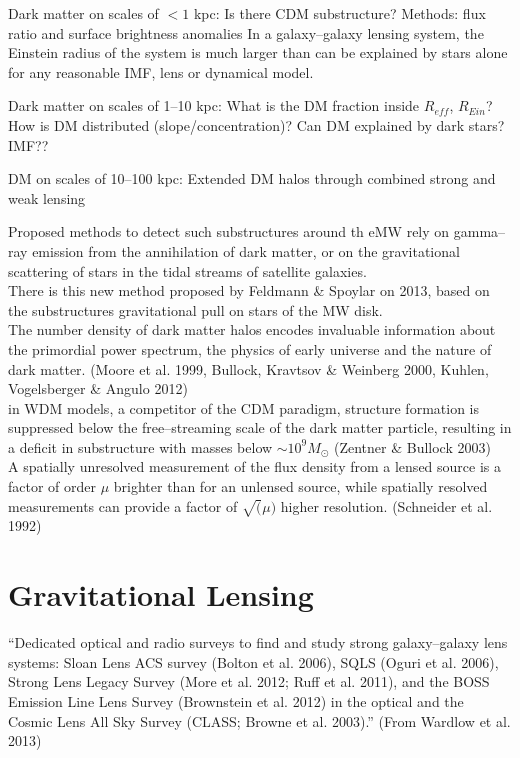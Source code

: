 \documentclass[paper=a4, fontsize=11pt]{scrartcl} %
\numberwithin{equation}{section} %
\numberwithin{figure}{section} %
\numberwithin{table}{section} %
\begin{document}
Dark matter on scales of $< 1$ kpc: Is there CDM substructure? Methods: flux ratio and surface brightness anomalies
In a galaxy--galaxy lensing system, the Einstein radius of the system is much larger than can be explained by stars alone for any reasonable IMF, lens or dynamical model.

Dark matter on scales of 1--10 kpc: What is the DM fraction inside $R_{eff}$, $R_{Ein}$?
How is DM distributed (slope/concentration)?
Can DM explained by dark stars? IMF??

DM on scales of 10--100 kpc: Extended DM halos through combined strong and weak lensing

 

Proposed methods to detect such substructures around th eMW rely on gamma--ray emission from the annihilation of dark matter, or on the gravitational scattering of stars in the tidal streams of satellite galaxies.\\
There is this new method proposed by Feldmann \& Spoylar on 2013, based on the substructures gravitational pull on stars of the MW disk.\\
The number density of dark matter halos encodes invaluable information about the primordial power spectrum, the physics of early universe and the nature of dark matter. (Moore et al. 1999, Bullock, Kravtsov \& Weinberg 2000, Kuhlen, Vogelsberger \& Angulo 2012)\\
in WDM models, a competitor of the CDM paradigm, structure formation is suppressed below the free--streaming scale of the dark matter particle, resulting in a deficit in substructure with masses below $\sim 10^9 M_\odot$ (Zentner \& Bullock 2003)\\


A spatially unresolved measurement of the flux density from a lensed source is a factor of order $\mu$ brighter than for an unlensed source, while spatially resolved measurements can provide a factor of $\sqrt(\mu)$ higher resolution. (Schneider et al. 1992)

\newpage
\section{Gravitational Lensing}
``Dedicated optical and radio surveys to find and study strong galaxy--galaxy lens systems: Sloan Lens ACS survey (Bolton et al. 2006), SQLS (Oguri et al. 2006), Strong Lens Legacy Survey (More et al. 2012; Ruff et al. 2011), and the BOSS Emission Line Lens Survey (Brownstein et al. 2012) in the optical and the Cosmic Lens All Sky Survey (CLASS; Browne et al. 2003).'' (From Wardlow et al. 2013)
\newpage
\end{document}
